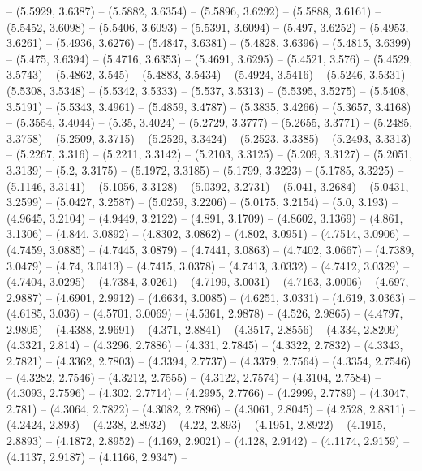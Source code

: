 {  -- (5.5929, 3.6387) -- (5.5882, 3.6354) -- (5.5896, 3.6292) -- (5.5888, 
  3.6161) -- (5.5452, 3.6098) -- (5.5406, 3.6093) -- (5.5391, 3.6094) -- (5.497,
   3.6252) -- (5.4953, 3.6261) -- (5.4936, 3.6276) -- (5.4847, 3.6381) -- 
  (5.4828, 3.6396) -- (5.4815, 3.6399) -- (5.475, 3.6394) -- (5.4716, 3.6353) --
   (5.4691, 3.6295) -- (5.4521, 3.576) -- (5.4529, 3.5743) -- (5.4862, 3.545) --
   (5.4883, 3.5434) -- (5.4924, 3.5416) -- (5.5246, 3.5331) -- (5.5308, 3.5348) 
  -- (5.5342, 3.5333) -- (5.537, 3.5313) -- (5.5395, 3.5275) -- (5.5408, 3.5191)
   -- (5.5343, 3.4961) -- (5.4859, 3.4787) -- (5.3835, 3.4266) -- (5.3657, 
  3.4168) -- (5.3554, 3.4044) -- (5.35, 3.4024) -- (5.2729, 3.3777) -- (5.2655, 
  3.3771) -- (5.2485, 3.3758) -- (5.2509, 3.3715) -- (5.2529, 3.3424) -- 
  (5.2523, 3.3385) -- (5.2493, 3.3313) -- (5.2267, 3.316) -- (5.2211, 3.3142) --
   (5.2103, 3.3125) -- (5.209, 3.3127) -- (5.2051, 3.3139) -- (5.2, 3.3175) -- 
  (5.1972, 3.3185) -- (5.1799, 3.3223) -- (5.1785, 3.3225) -- (5.1146, 3.3141) 
  -- (5.1056, 3.3128) -- (5.0392, 3.2731) -- (5.041, 3.2684) -- (5.0431, 3.2599)
   -- (5.0427, 3.2587) -- (5.0259, 3.2206) -- (5.0175, 3.2154) -- (5.0, 3.193) 
  -- (4.9645, 3.2104) -- (4.9449, 3.2122) -- (4.891, 3.1709) -- (4.8602, 3.1369)
   -- (4.861, 3.1306) -- (4.844, 3.0892) -- (4.8302, 3.0862) -- (4.802, 3.0951) 
  -- (4.7514, 3.0906) -- (4.7459, 3.0885) -- (4.7445, 3.0879) -- (4.7441, 
  3.0863) -- (4.7402, 3.0667) -- (4.7389, 3.0479) -- (4.74, 3.0413) -- (4.7415, 
  3.0378) -- (4.7413, 3.0332) -- (4.7412, 3.0329) -- (4.7404, 3.0295) -- 
  (4.7384, 3.0261) -- (4.7199, 3.0031) -- (4.7163, 3.0006) -- (4.697, 2.9887) --
   (4.6901, 2.9912) -- (4.6634, 3.0085) -- (4.6251, 3.0331) -- (4.619, 3.0363) 
  -- (4.6185, 3.036) -- (4.5701, 3.0069) -- (4.5361, 2.9878) -- (4.526, 2.9865) 
  -- (4.4797, 2.9805) -- (4.4388, 2.9691) -- (4.371, 2.8841) -- (4.3517, 2.8556)
   -- (4.334, 2.8209) -- (4.3321, 2.814) -- (4.3296, 2.7886) -- (4.331, 2.7845) 
  -- (4.3322, 2.7832) -- (4.3343, 2.7821) -- (4.3362, 2.7803) -- (4.3394, 
  2.7737) -- (4.3379, 2.7564) -- (4.3354, 2.7546) -- (4.3282, 2.7546) -- 
  (4.3212, 2.7555) -- (4.3122, 2.7574) -- (4.3104, 2.7584) -- (4.3093, 2.7596) 
  -- (4.302, 2.7714) -- (4.2995, 2.7766) -- (4.2999, 2.7789) -- (4.3047, 2.781) 
  -- (4.3064, 2.7822) -- (4.3082, 2.7896) -- (4.3061, 2.8045) -- (4.2528, 
  2.8811) -- (4.2424, 2.893) -- (4.238, 2.8932) -- (4.22, 2.893) -- (4.1951, 
  2.8922) -- (4.1915, 2.8893) -- (4.1872, 2.8952) -- (4.169, 2.9021) -- (4.128, 
  2.9142) -- (4.1174, 2.9159) -- (4.1137, 2.9187) -- (4.1166, 2.9347) -- 
}
